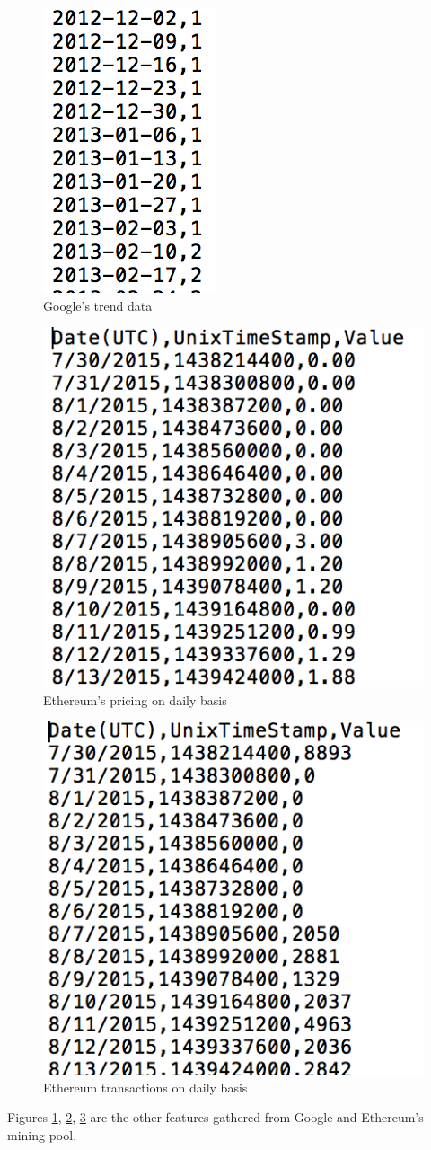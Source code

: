 \documentclass[sigconf]{acmart}
\begin{document}
\begin{figure}[!ht]
  \centering\includegraphics[width=0.18\columnwidth]{images/googledata.png}
  \caption{Google's trend data \cite{google:online}}
  \label{fig:googledata}
\end{figure}

\begin{figure}[!ht]
  \centering\includegraphics[width=0.4\columnwidth]{images/ethprice.png}
  \caption{Ethereum's pricing on daily basis \cite{Ethereum:online}}
  \label{fig:ethpri}
\end{figure}

\begin{figure}[!ht]
  \centering\includegraphics[width=0.4\columnwidth]{images/ethtran.png}
  \caption{Ethereum transactions on daily basis \cite{Ethereum:online}}
  \label{fig:ethtran}
\end{figure}

Figures \ref{fig:googledata}, \ref{fig:ethpri}, \ref{fig:ethtran} are the other features gathered from Google and Ethereum's mining pool. 
\end{document}
